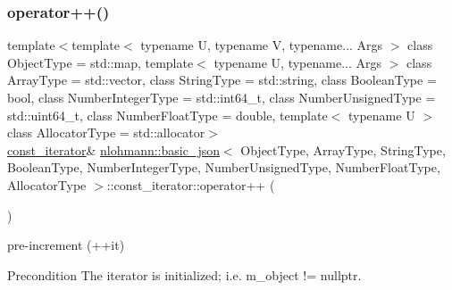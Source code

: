 \subsubsection{\texorpdfstring{operator++()}{operator++()}\hspace{0.1cm}{\footnotesize\ttfamily [2/2]}}
{\footnotesize\ttfamily template$<$template$<$ typename U, typename V, typename... Args $>$ class Object\+Type = std\+::map, template$<$ typename U, typename... Args $>$ class Array\+Type = std\+::vector, class String\+Type  = std\+::string, class Boolean\+Type  = bool, class Number\+Integer\+Type  = std\+::int64\+\_\+t, class Number\+Unsigned\+Type  = std\+::uint64\+\_\+t, class Number\+Float\+Type  = double, template$<$ typename U $>$ class Allocator\+Type = std\+::allocator$>$ \\
\hyperlink{classnlohmann_1_1basic__json_1_1const__iterator}{const\+\_\+iterator}\& \hyperlink{classnlohmann_1_1basic__json}{nlohmann\+::basic\+\_\+json}$<$ Object\+Type, Array\+Type, String\+Type, Boolean\+Type, Number\+Integer\+Type, Number\+Unsigned\+Type, Number\+Float\+Type, Allocator\+Type $>$\+::const\+\_\+iterator\+::operator++ (\begin{DoxyParamCaption}{ }\end{DoxyParamCaption})\hspace{0.3cm}{\ttfamily [inline]}}



pre-\/increment (++it) 

\begin{DoxyPrecond}{Precondition}
The iterator is initialized; i.\+e. {\ttfamily m\+\_\+object != nullptr}. 
\end{DoxyPrecond}
\hypertarget{classnlohmann_1_1basic__json_1_1const__iterator_a0d5820d1dda9dea3bbeb029cacf68522}{}\label{classnlohmann_1_1basic__json_1_1const__iterator_a0d5820d1dda9dea3bbeb029cacf68522} 
